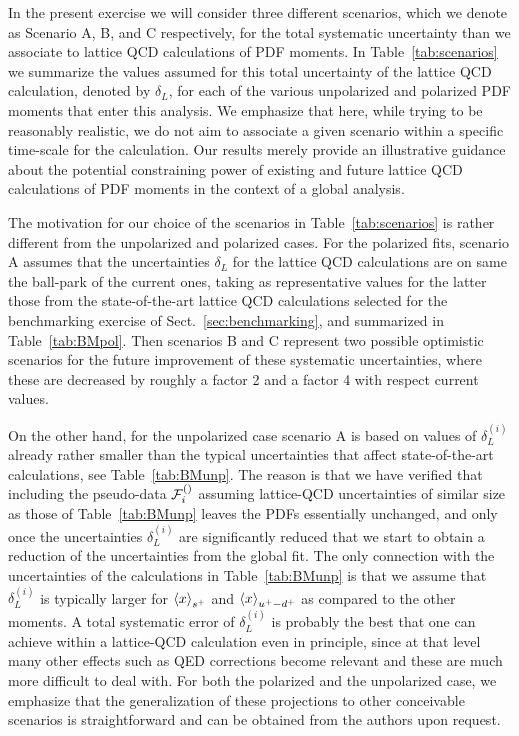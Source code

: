 In the present exercise we will consider three
different scenarios, which we denote
as Scenario A, B, and C respectively, for the total systematic
uncertainty than we associate to lattice
QCD calculations of PDF moments.
%
In Table~\ref{tab:scenarios} we summarize the
values assumed for this total uncertainty
    of the lattice QCD calculation, denoted by $\delta_L$, for each
    of the various unpolarized and polarized PDF moments that enter
    this analysis.
    We emphasize that here, while trying to be reasonably
    realistic, we do not aim to associate a given scenario
    within a specific time-scale for the calculation.
    Our results  merely provide an illustrative guidance about the potential
    constraining power of existing and future lattice QCD calculations
    of PDF  moments in the context
    of a global analysis.
    
    The motivation for our choice of the scenarios
    in Table~\ref{tab:scenarios}
    is rather different from the unpolarized and polarized cases.
    For the polarized fits,
    scenario A assumes that the uncertainties $\delta_L$
    for the lattice QCD calculations
    are on same the ball-park of the current ones, taking as
    representative values for the latter  those from the
    state-of-the-art lattice QCD calculations
    selected for the benchmarking exercise of Sect.~\ref{sec:benchmarking},
    and summarized in Table~\ref{tab:BMpol}.
    Then scenarios B and C represent two possible optimistic scenarios for the
    future improvement of these systematic uncertainties, where these are decreased
    by roughly a factor 2 and a factor 4 with respect current values.
    
    On the other hand, for the unpolarized case scenario A is based on values
    of $\delta_L^{(i)}$ already rather smaller than the typical
    uncertainties that affect state-of-the-art calculations, see Table~\ref{tab:BMunp}.
    The reason is that we have verified that including the pseudo-data $\mathcal{F}_i^{(\rm)}$
    assuming lattice-QCD uncertainties of similar size as those of Table~\ref{tab:BMunp}
    leaves the PDFs essentially unchanged, and only once the uncertainties
    $\delta_L^{(i)}$ are significantly reduced that we start to obtain a reduction
    of the uncertainties from the global fit.
    The only connection with the uncertainties of the calculations in Table~\ref{tab:BMunp}
    is that we assume that $\delta_L^{(i)}$ is typically larger for $\left\langle x\right\rangle_{s^+}$
    and $\left\langle x\right\rangle_{u^+-d^+}$ as compared to the other moments.
    A total systematic error of $\delta_L^{(i)}$ is probably the best that one can achieve
    within a lattice-QCD calculation even in principle, since at that level many other
    effects such as QED corrections become relevant and these are much more difficult
    to deal with.
    For both
    the polarized and
    the unpolarized case,
    we emphasize that the generalization of these projections to other conceivable scenarios
    is straightforward and can be obtained from the authors upon request.
 
